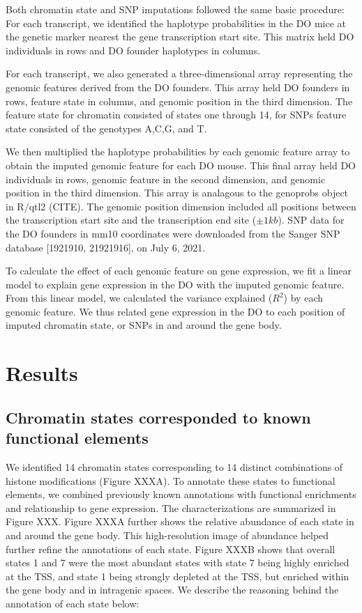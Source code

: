 \documentclass[10pt,letterpaper]{article}
\begin{document}
Both chromatin state and SNP imputations followed the same basic
procedure: For each transcript, we identified the haplotype
probabilities in the DO mice at the genetic marker nearest the gene
transcription start site. This matrix held DO individuals in rows and DO
founder haplotypes in columns.

For each transcript, we also generated a three-dimensional array
representing the genomic features derived from the DO founders. This
array held DO founders in rows, feature state in columns, and genomic
position in the third dimension. The feature state for chromatin
consisted of states one through 14, for SNPs feature state consisted of
the genotypes A,C,G, and T.

We then multiplied the haplotype probabilities by each genomic feature
array to obtain the imputed genomic feature for each DO mouse. This
final array held DO individuals in rows, genomic feature in the second
dimension, and genomic position in the third dimension. This array is
analagous to the genoprobs object in R/qtl2 (CITE). The genomic position
dimension included all positions between the transcription start site
and the transcription end site (\(\pm 1kb\)). SNP data for the DO
founders in mm10 coordinates were downloaded from the Sanger SNP
database {[}1921910, 21921916{]}, on July 6, 2021.

To calculate the effect of each genomic feature on gene expression, we
fit a linear model to explain gene expression in the DO with the imputed
genomic feature. From this linear model, we calculated the variance
explained (\(R^2\)) by each genomic feature. We thus related gene
expression in the DO to each position of imputed chromatin state, or
SNPs in and around the gene body.

\hypertarget{results}{%
\section{Results}\label{results}}

\hypertarget{chromatin-states-corresponded-to-known-functional-elements}{%
\subsection{Chromatin states corresponded to known functional
elements}\label{chromatin-states-corresponded-to-known-functional-elements}}

We identified 14 chromatin states corresponding to 14 distinct
combinations of histone modifications (Figure XXXA). To annotate these
states to functional elements, we combined previously known annotations
with functional enrichments and relationship to gene expression. The
characterizations are summarized in Figure XXX. Figure XXXA further
shows the relative abundance of each state in and around the gene body.
This high-resolution image of abundance helped further refine the
annotations of each state. Figure XXXB shows that overall states 1 and 7
were the most abundant states with state 7 being highly enriched at the
TSS, and state 1 being strongly depleted at the TSS, but enriched within
the gene body and in intragenic spaces. We describe the reasoning behind
the annotation of each state below:
\end{document}
